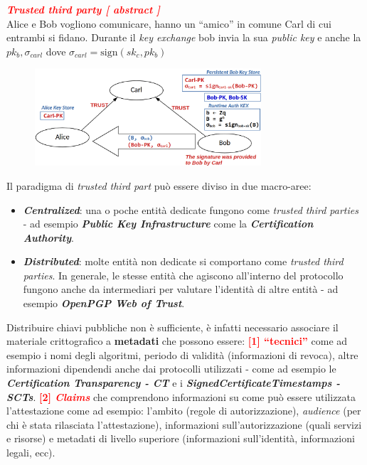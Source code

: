 \begin{flushleft}
    \newpage

    \textcolor{red}{\textbf{\textit{Trusted third party [ abstract ]}}} \\
    Alice e Bob vogliono comunicare, hanno un ``amico'' in comune Carl di cui entrambi si fidano. Durante il \textit{key exchange} bob invia la sua \textit{public key} e anche la $pk_b, \sigma_{carl}$ dove $\sigma_{carl} = \text{sign}(sk_c, pk_b)$

    \begin{figure}[h]
        \centering
        \includegraphics[width=0.75\textwidth]{img/ab_ca.png}
    \end{figure}

    Il paradigma di \textit{trusted third part} può essere diviso in due macro-aree:
    \begin{itemize}[nosep]
        \item \textbf{\textit{Centralized}}: una o poche entità dedicate fungono come \textit{trusted third parties} - ad esempio \textbf{\textit{Public Key Infrastructure}} come la \textbf{\textit{Certification Authority}}.
        \item \textbf{\textit{Distributed}}: molte entità non dedicate si comportano come \textit{trusted third parties}. In generale, le stesse entità che agiscono all'interno del protocollo fungono anche da intermediari per valutare l'identità di altre entità - ad esempio \textbf{\textit{OpenPGP Web of Trust}}.
    \end{itemize}

    Distribuire chiavi pubbliche non è sufficiente, è infatti necessario associare il materiale crittografico a \textbf{metadati} che possono essere: \textcolor{red}{\textbf{[1] ``tecnici''}} come ad esempio i nomi degli algoritmi, periodo di validità (informazioni di revoca), altre informazioni dipendendi anche dai protocolli utilizzati - come ad esempio le \textbf{\textit{Certification Transparency - CT}} e i \textbf{\textit{SignedCertificateTimestamps - SCTs}}. \textcolor{red}{\textbf{[2] \textit{Claims}}} che comprendono informazioni su come può essere utilizzata l'attestazione come ad esempio: l'ambito (regole di autorizzazione), \textit{audience} (per chi è stata rilasciata l'attestazione), informazioni sull'autorizzazione (quali servizi e risorse) e metadati di livello superiore (informazioni sull'identità, informazioni legali, ecc).


\end{flushleft}
